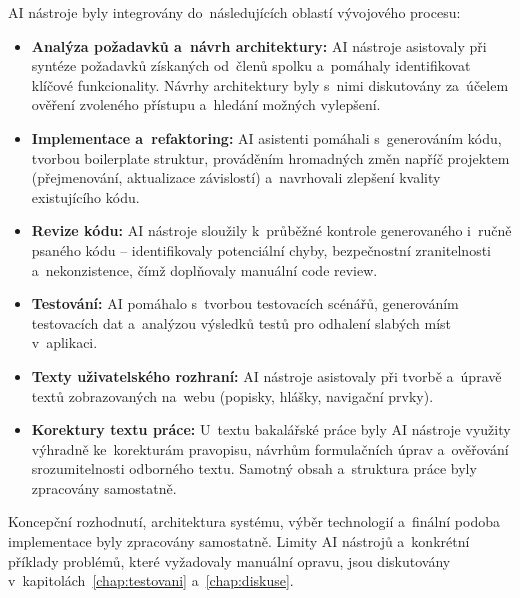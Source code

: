 AI nástroje byly integrovány do~následujících oblastí vývojového procesu:
\begin{itemize}
    \item \textbf{Analýza požadavků a~návrh architektury:} AI nástroje asistovaly při syntéze požadavků získaných od~členů spolku a~pomáhaly identifikovat klíčové funkcionality. Návrhy architektury byly s~nimi diskutovány za~účelem ověření zvoleného přístupu a~hledání možných vylepšení.

    \item \textbf{Implementace a~refaktoring:} AI asistenti pomáhali s~generováním kódu, tvorbou boilerplate struktur, prováděním hromadných změn napříč projektem (přejmenování, aktualizace závislostí) a~navrhovali zlepšení kvality existujícího kódu.

    \item \textbf{Revize kódu:} AI nástroje sloužily k~průběžné kontrole generovaného i~ručně psaného kódu -- identifikovaly potenciální chyby, bezpečnostní zranitelnosti a~nekonzistence, čímž doplňovaly manuální code review.

    \item \textbf{Testování:} AI pomáhalo s~tvorbou testovacích scénářů, generováním testovacích dat a~analýzou výsledků testů pro odhalení slabých míst v~aplikaci.

    \item \textbf{Texty uživatelského rozhraní:} AI nástroje asistovaly při tvorbě a~úpravě textů zobrazovaných na~webu (popisky, hlášky, navigační prvky).

    \item \textbf{Korektury textu práce:} U~textu bakalářské práce byly AI nástroje využity výhradně ke~korekturám pravopisu, návrhům formulačních úprav a~ověřování srozumitelnosti odborného textu. Samotný obsah a~struktura práce byly zpracovány samostatně.
\end{itemize}

Koncepční rozhodnutí, architektura systému, výběr technologií a~finální podoba implementace byly zpracovány samostatně. Limity AI nástrojů a~konkrétní příklady problémů, které vyžadovaly manuální opravu, jsou diskutovány v~kapitolách~\ref{chap:testovani} a~\ref{chap:diskuse}.

